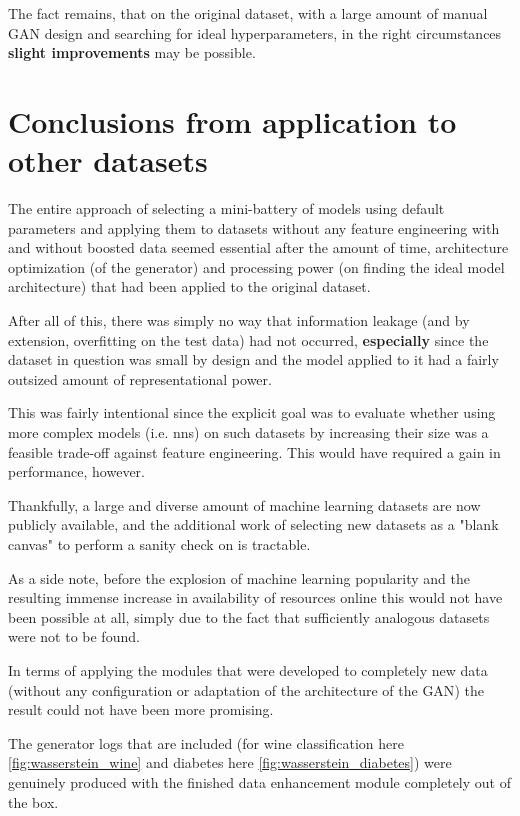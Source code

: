 The fact remains, that on the original dataset, with a large amount of manual \ac{GAN} design and searching for ideal hyperparameters, in the right circumstances \textbf{slight improvements} may be possible.

\pagebreak

\section{Conclusions from application to other datasets}

The entire approach of selecting a mini-battery of models using default parameters and applying them to datasets without any feature engineering with and without boosted data seemed essential after the amount of time, architecture optimization (of the generator) and processing power (on finding the ideal model architecture) that had been applied to the original dataset.

After all of this, there was simply no way that information leakage (and by extension, overfitting on the test data) had not occurred, \textbf{especially} since the dataset in question was small by design and the model applied to it had a fairly outsized amount of representational power. 

This was fairly intentional since the explicit goal was to evaluate whether using more complex models (i.e. \acp{nn}) on such datasets by increasing their size was a feasible trade-off against feature engineering. This would have required a gain in performance, however.

Thankfully, a large and diverse amount of machine learning datasets are now publicly available, and the additional work of selecting new datasets as a "blank canvas" to perform a sanity check on is tractable. 

As a side note, before the explosion of machine learning popularity and the resulting immense increase in availability of resources online this would not have been possible at all, simply due to the fact that sufficiently analogous datasets were not to be found.

\pagebreak

In terms of applying the modules that were developed to completely new data (without any configuration or adaptation of the architecture of the \ac{GAN}) the result could not have been more promising. 

The generator logs that are included (for wine classification here \ref{fig:wasserstein_wine} and diabetes here \ref{fig:wasserstein_diabetes}) were genuinely produced with the finished data enhancement module completely out of the box. 

